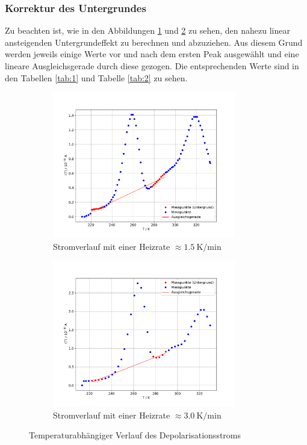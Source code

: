 \subsubsection{Korrektur des Untergrundes}
Zu beachten ist, wie in den Abbildungen \ref{fig:rohdaten1} und
\ref{fig:rohdaten2} zu sehen,
den nahezu linear ansteigenden Untergrundeffekt zu berechnen und abzuziehen.
Aus diesem Grund werden jeweils einige Werte vor und nach dem ersten Peak
ausgewählt und
eine lineare Ausgleichsgerade durch diese gezogen.
Die entsprechenden Werte sind in den Tabellen \ref{tab:1} und Tabelle
\ref{tab:2} zu sehen.
\begin{figure}[H]
\centering
\begin{subfigure}{0.49\textwidth}
\centering
\includegraphics[width=8cm]{Messdaten_1.pdf}
\caption{Stromverlauf mit einer Heizrate $\approx \SI{1.5}{\kelvin\per\minute}$}
\label{fig:rohdaten1}
\end{subfigure}
\begin{subfigure}{0.49\textwidth}
\centering
\includegraphics[width=8cm]{Messdaten_2.pdf}
\caption{Stromverlauf mit einer Heizrate $\approx \SI{3.0}{\kelvin\per\minute}$}
\label{fig:rohdaten2}
\end{subfigure}
\caption{Temperaturabhängiger Verlauf des Depolarisationsstroms }
\label{abb:rohdaten}
\end{figure}
